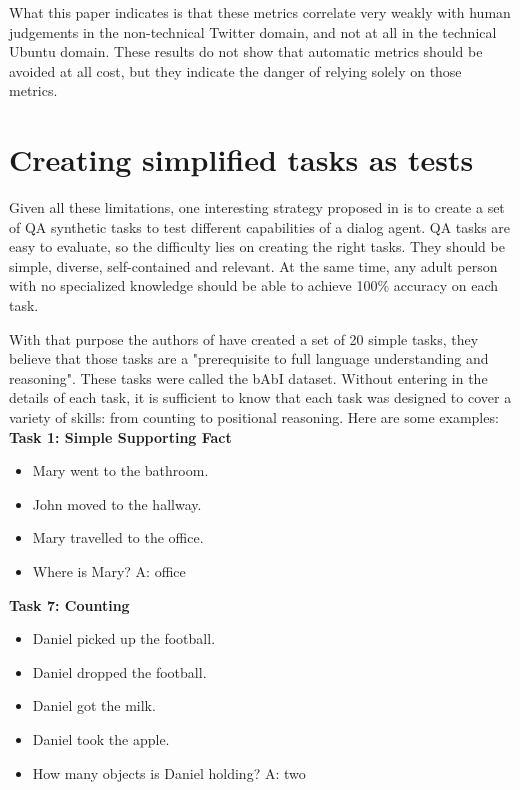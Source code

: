 What this paper indicates is that these metrics correlate very weakly with human judgements in the non-technical Twitter domain, and not at all in the technical Ubuntu domain. These results do not show that automatic metrics should be avoided at all cost, but they indicate the danger of relying solely on those metrics.

\section{Creating simplified tasks as tests}
\label{ch:03-tasks}

Given all these limitations, one interesting strategy proposed in \cite{WestonBCM15} is to create a set of QA synthetic tasks to test different capabilities of a dialog agent. QA tasks are easy to evaluate, so the difficulty lies on creating the right tasks. They should be simple, diverse, self-contained and relevant. At the same time, any adult person with no specialized knowledge should be able to achieve 100$\%$ accuracy on each task.

With that purpose the authors of \cite{WestonBCM15} have created a set of 20 simple tasks, they believe that those tasks are a "prerequisite to full language understanding and reasoning". These tasks were called the bAbI dataset. Without entering in the details of each task, it is sufficient to know that each task was designed to cover a variety of skills: from counting to positional reasoning. Here are some examples:\\

\textbf{Task 1: Simple Supporting Fact} 
\begin{itemize} 
\item[] Mary went to the bathroom.
\item[] John moved to the hallway.
\item[] Mary travelled to the office.
\item[] Where is Mary? A: office
\end{itemize}

\vspace{0.3cm}

\textbf{Task 7: Counting}
\begin{itemize} 
\item[] Daniel picked up the football.
\item[] Daniel dropped the football.
\item[] Daniel got the milk.
\item[] Daniel took the apple.
\item[] How many objects is Daniel holding? A: two
\end{itemize} 

